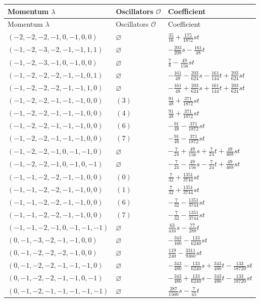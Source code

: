 \begingroup\scriptsize
\setlength{\tabcolsep}{5pt}
\begin{longtable}{@{}lll@{}}
\toprule
Momentum $\lambda$ & Oscillators $\mathcal O$ & Coefficient\\
\midrule\endfirsthead
\toprule
Momentum $\lambda$ & Oscillators $\mathcal O$ & Coefficient\\
\midrule\endhead
\bottomrule\endfoot
$(-2,-2,-2,-1,0,-1,0,0)$ & $\varnothing$ & $\frac{35}{16}+\allowbreak \frac{175}{1872}st$\\
$(-1,-2,-3,-2,-1,-1,1,1)$ & $\varnothing$ & $-\frac{203}{208}s-\frac{161}{48}t$\\
$(-1,-2,-3,-1,0,-1,0,0)$ & $\varnothing$ & $\frac{7}{8}-\frac{49}{156}st$\\
$(-1,-2,-2,-2,-1,-1,0,1)$ & $\varnothing$ & $-\frac{161}{48}-\frac{203}{624}s-\frac{161}{144}t+\allowbreak \frac{203}{624}st$\\
$(-1,-2,-2,-2,-1,-1,1,0)$ & $\varnothing$ & $-\frac{161}{48}+\allowbreak \frac{203}{624}s+\allowbreak \frac{161}{144}t+\allowbreak \frac{203}{624}st$\\
$(-1,-2,-2,-1,-1,-1,0,0)$ & $(3)$ & $\frac{91}{48}+\allowbreak \frac{371}{1872}st$\\
$(-1,-2,-2,-1,-1,-1,0,0)$ & $(4)$ & $\frac{91}{48}+\allowbreak \frac{371}{1872}st$\\
$(-1,-2,-2,-1,-1,-1,0,0)$ & $(6)$ & $-\frac{91}{48}-\frac{371}{1872}st$\\
$(-1,-2,-2,-1,-1,-1,0,0)$ & $(7)$ & $-\frac{91}{48}-\frac{371}{1872}st$\\
$(-1,-2,-2,-1,0,-1,-1,0)$ & $\varnothing$ & $-\frac{7}{24}+\allowbreak \frac{49}{156}s+\allowbreak \frac{7}{24}t+\allowbreak \frac{49}{468}st$\\
$(-1,-2,-2,-1,0,-1,0,-1)$ & $\varnothing$ & $-\frac{7}{24}-\frac{49}{156}s-\frac{7}{24}t+\allowbreak \frac{49}{468}st$\\
$(-1,-1,-2,-2,-1,-1,0,0)$ & $(0)$ & $\frac{7}{32}+\allowbreak \frac{1351}{3744}st$\\
$(-1,-1,-2,-2,-1,-1,0,0)$ & $(1)$ & $\frac{7}{32}+\allowbreak \frac{1351}{3744}st$\\
$(-1,-1,-2,-2,-1,-1,0,0)$ & $(6)$ & $-\frac{7}{32}-\frac{1351}{3744}st$\\
$(-1,-1,-2,-2,-1,-1,0,0)$ & $(7)$ & $-\frac{7}{32}-\frac{1351}{3744}st$\\
$(-1,-1,-2,-1,0,-1,-1,-1)$ & $\varnothing$ & $\frac{63}{416}s-\frac{77}{288}t$\\
$(0,-1,-3,-2,-1,-1,0,0)$ & $\varnothing$ & $-\frac{343}{160}-\frac{133}{6240}st$\\
$(0,-1,-2,-2,-2,-1,0,0)$ & $\varnothing$ & $\frac{119}{240}-\frac{3311}{9360}st$\\
$(0,-1,-2,-2,-1,-1,-1,0)$ & $\varnothing$ & $-\frac{343}{480}-\frac{133}{6240}s+\allowbreak \frac{343}{480}t-\frac{133}{18720}st$\\
$(0,-1,-2,-2,-1,-1,0,-1)$ & $\varnothing$ & $-\frac{343}{480}+\allowbreak \frac{133}{6240}s-\frac{343}{480}t-\frac{133}{18720}st$\\
$(0,-1,-2,-1,-1,-1,-1,-1)$ & $\varnothing$ & $\frac{287}{1560}s-\frac{7}{45}t$\\
\end{longtable}
\endgroup
